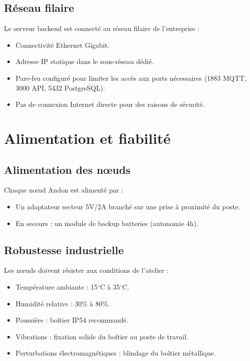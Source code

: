 \subsection{R\'eseau filaire}

Le serveur backend est connect\'e au r\'eseau filaire de l'entreprise :

\begin{itemize}
    \item Connectivit\'e Ethernet Gigabit.
    \item Adresse IP statique dans le sous-r\'eseau d\'edi\'e.
    \item Pare-feu configur\'e pour limiter les acc\`es aux ports n\'ecessaires (1883 MQTT, 3000 API, 5432 PostgreSQL).
    \item Pas de connexion Internet directe pour des raisons de s\'ecurit\'e.
\end{itemize}

\section{Alimentation et fiabilit\'e}

\subsection{Alimentation des n\oe{}uds}

Chaque n\oe{}ud Andon est aliment\'e par :

\begin{itemize}
    \item Un adaptateur secteur 5V/2A branch\'e sur une prise \`a proximit\'e du poste.
    \item En secours : un module de backup batteries (autonomie 4h).
\end{itemize}

\subsection{Robustesse industrielle}

Les n\oe{}uds doivent r\'esister aux conditions de l'atelier :

\begin{itemize}
    \item Temp\'erature ambiante : 15$^\circ$C \`a 35$^\circ$C.
    \item Humidit\'e relative : 30\% \`a 80\%.
    \item Poussi\`ere : bo\^itier IP54 recommand\'e.
    \item Vibrations : fixation solide du bo\^itier au poste de travail.
    \item Perturbations \'electromagn\'etiques : blindage du bo\^itier m\'etallique.
\end{itemize}

